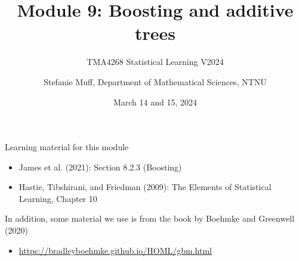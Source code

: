 \documentclass[
  10pt,
  ignorenonframetext,
]{beamer}
\title{Module 9: Boosting and additive trees}
\subtitle{TMA4268 Statistical Learning V2024}
\author{Stefanie Muff, Department of Mathematical Sciences, NTNU}
\date{March 14 and 15, 2024}
\providecommand{\tightlist}{%
  \setlength{\itemsep}{0pt}\setlength{\parskip}{0pt}}
\begin{document}
\frame{\titlepage}

\begin{frame}
\begin{block}{Learning material for this module}
\protect\hypertarget{learning-material-for-this-module}{}
\(~\)

\begin{itemize}
\tightlist
\item
  James et al. (2021): Section 8.2.3 (Boosting)
\end{itemize}

\vspace{2mm}

\begin{itemize}
\tightlist
\item
  Hastie, Tibshirani, and Friedman (2009): The Elements of Statistical
  Learning, Chapter 10
\end{itemize}

\vspace{8mm}

In addition, some material we use is from the book by Boehmke and
Greenwell (2020)

\vspace{2mm}

\begin{itemize}
\tightlist
\item
  \url{https://bradleyboehmke.github.io/HOML/gbm.html}
\end{itemize}
\end{block}
\end{frame}
\end{document}
